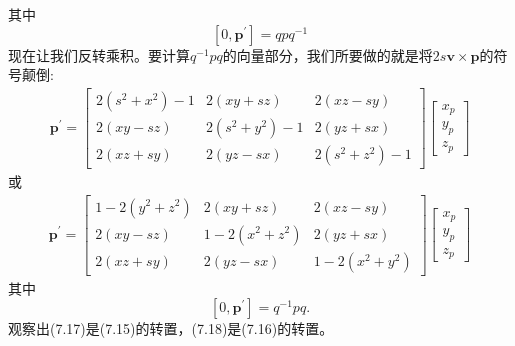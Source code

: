 其中
$$
\left[0, \mathbf{p}^{\prime}\right]=q p q^{-1}
$$
现在让我们反转乘积。要计算$q^{-1} p q$的向量部分，我们所要做的就是将$2s \mathbf{v} \times\mathbf{p}$的符号颠倒:
\begin{align}
\mathbf{p}^{\prime}=\left[\begin{array}{ccc}
2\left(s^{2}+x^{2}\right)-1 & 2(x y+s z) & 2(x z-s y) \\
2(x y-s z) & 2\left(s^{2}+y^{2}\right)-1 & 2(y z+s x) \\
2(x z+s y) & 2(y z-s x) & 2\left(s^{2}+z^{2}\right)-1
\end{array}\right]\left[\begin{array}{l}
x_{p} \\
y_{p} \\
z_{p}
\end{array}\right]
\end{align}
或
\begin{align}
\mathbf{p}^{\prime}=\left[\begin{array}{ccc}
1-2\left(y^{2}+z^{2}\right) & 2(x y+s z) & 2(x z-s y) \\
2(x y-s z) & 1-2\left(x^{2}+z^{2}\right) & 2(y z+s x) \\
2(x z+s y) & 2(y z-s x) & 1-2\left(x^{2}+y^{2}\right)
\end{array}\right]\left[\begin{array}{l}
x_{p} \\
y_{p} \\
z_{p}
\end{array}\right]
\end{align}
其中
$$
\left[0, \mathbf{p}^{\prime}\right]=q^{-1} p q .
$$
观察出(7.17)是(7.15)的转置，(7.18)是(7.16)的转置。

